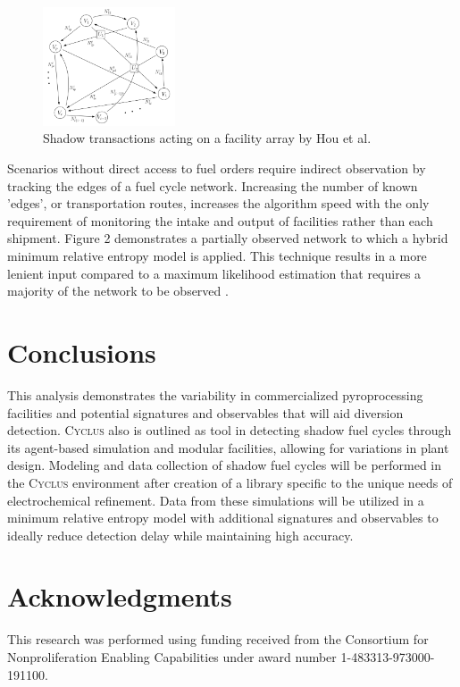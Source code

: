 \documentclass{anstrans}
\newcommand{\Cyclus}{\textsc{Cyclus}\xspace}%
\begin{document}
\begin{figure}[ht] %
	\centering
	\includegraphics[width=0.35\textwidth]{Hou_Network}
	\caption{Shadow transactions acting on a facility array by Hou et al\cite{Hou_2016}.}
	\label{fig:maximumlikelihood}
\end{figure}


Scenarios without direct access to fuel orders require indirect observation by tracking the edges of a fuel cycle network. Increasing the number of known 'edges', or transportation routes, increases the algorithm speed with the only requirement of monitoring the intake and output of facilities rather than each shipment. Figure 2 demonstrates a partially observed network to which a hybrid minimum relative entropy model is applied. This technique results in a more lenient input compared to a maximum likelihood estimation that requires a majority of the network to be observed \cite{Hou_2016}.



\section{Conclusions}
This analysis demonstrates the variability in commercialized pyroprocessing facilities and potential signatures and observables that will aid diversion detection. \Cyclus also is outlined as tool in detecting shadow fuel cycles through its agent-based simulation and modular facilities, allowing for variations in plant design. Modeling and data collection of shadow fuel cycles will be performed in the \Cyclus environment after creation of a library specific to the unique needs of electrochemical refinement. Data from these simulations will be utilized in a minimum relative entropy model with additional signatures and observables to ideally reduce detection delay while maintaining high accuracy.

\section{Acknowledgments}
This research was performed using funding received from the Consortium for Nonproliferation Enabling Capabilities under award number 1-483313-973000-191100.



\end{document}
